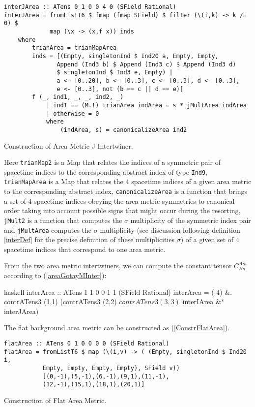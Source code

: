 \begin{listing}[hbt!]
\begin{verbatim}
interJArea :: ATens 0 1 0 0 4 0 (SField Rational)
interJArea = fromListT6 $ fmap (fmap SField) $ filter (\(i,k) -> k /= 0) $
             map (\x -> (x,f x)) inds
    where
        trianArea = trianMapArea
        inds = [(Empty, singletonInd $ Ind20 a, Empty, Empty,
               Append (Ind3 b) $ Append (Ind3 c) $ Append (Ind3 d)
               $ singletonInd $ Ind3 e, Empty) |
               a <- [0..20], b <- [0..3], c <- [0..3], d <- [0..3],
               e <- [0..3], not (b == c || d == e)]
        f (_, ind1, _, _, ind2, _)
            | ind1 == (M.!) trianArea indArea = s * jMultArea indArea
            | otherwise = 0
            where
                (indArea, s) = canonicalizeArea ind2
\end{verbatim} 
\caption{Construction of Area Metric J Intertwiner.}\label{ConstrInterJArea}
\end{listing}
Here \texttt{trianMap2} is a Map that relates the indices of a symmetric pair of spacetime indices to the corresponding abstract index of type \texttt{Ind9}, \texttt{trianMapArea} is a Map that relates the $4$ spacetime indices of a given area metric to the corresponding abstract index, \texttt{canonicalizeArea} is a function that brings a set of $4$ spacetime indices obeying the area metric symmetries to canonical order taking into account possible signs that might occur during the resorting, \texttt{jMult2} is a function that computes the $\sigma$ multiplicity of the symmetric index pair and \texttt{jMultArea} computes the $\sigma$ multiplicity (see discussion following definition \ref{interDef} for the precise definition of these multiplicities $\sigma$) of a given set of $4$ spacetime indices that correspond to one area metric.

From the two area metric intertwiners, we can compute the constant tensor $C^{Am}_{Bn}$ according to (\ref{areaGotayMInter}):

\begin{center}
\begin{cminted}{haskell}
interArea :: ATens 1 1 0 0 1 1 (SField Rational)
interArea = (-4) &. contrATens3 (1,1) (contrATens3 (2,2) $
            contrATens3 (3,3) $ interIArea &* interJArea)
\end{cminted}
\end{center}
The flat background area metric can be constructed as (\ref{ConstrFlatArea}).
\begin{listing}[hbt!]
\begin{verbatim}
flatArea :: ATens 0 1 0 0 0 0 (SField Rational)
flatArea = fromListT6 $ map (\(i,v) -> ( (Empty, singletonInd $ Ind20 i,
           Empty, Empty, Empty, Empty), SField v))
           [(0,-1),(5,-1),(6,-1),(9,1),(11,-1),
           (12,-1),(15,1),(18,1),(20,1)]
\end{verbatim} 
\caption{Construction of Flat Area Metric.}\label{ConstrFlatArea}
\end{listing}

